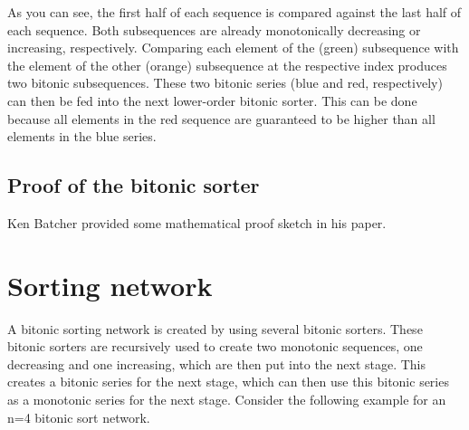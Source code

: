 \documentclass{article}
\newcommand{\compareBlock}[2][]{
    \pgfkeys{/compareBlock, default, #1}%
    \coordinate (\cbName_a) at ($(0, 1.33) + #2$);
    \coordinate (\cbName_b) at ($(0, 0.66) + #2$);
    \coordinate (\cbName_l) at ($(1.5, 0.66) + #2$);
    \coordinate (\cbName_h) at ($(1.5, 1.33) + #2$);

    \draw[color=\cbCA] (\cbName_a) -- ++(0.2, 0)node[anchor=west]{\cbA};
    \draw[color=\cbCB] (\cbName_b) -- ++(0.2, 0)node[anchor=west]{\cbB};
    \draw[color=\cbCL] (\cbName_l) -- ++(-0.2, 0)node[anchor=east]{\cbL};
    \draw[color=\cbCH] (\cbName_h) -- ++(-0.2, 0)node[anchor=east]{\cbH};
    \draw[draw=black] #2 rectangle ++(1.5,2);
}
\newcommand{\connectCB}[3]{
    \draw[color=#3] (#1) -- (#2);
}
\newcommand{\outputCB}[3]{
    \coordinate (#2) at ($(#1_h) + (0.25, 0)$);
    \coordinate (#3) at ($(#1_l) + (0.25, 0)$);
    \node at (#2) [anchor=west]{#2};
    \node at (#3) [anchor=west]{#3};
    \connectCB{#2}{#1_h}{black}
    \connectCB{#3}{#1_l}{black}
}
\begin{document}
As you can see, the first half of each sequence is compared against the last half of each sequence. 
Both subsequences are already monotonically decreasing or increasing, respectively.
Comparing each element of the (green) subsequence with the element of the other (orange) subsequence at the respective index produces two bitonic subsequences.
These two bitonic series (blue and red, respectively) can then be fed into the next lower-order bitonic sorter.
This can be done because all elements in the red sequence are guaranteed to be higher than all elements in the blue series.

\subsection{Proof of the bitonic sorter}

Ken Batcher provided some mathematical proof sketch in his paper.

\section{Sorting network}

A bitonic sorting network is created by using several bitonic sorters. 
These bitonic sorters are recursively used to create two monotonic sequences, one decreasing and one increasing, which are then put into the next stage.
This creates a bitonic series for the next stage, which can then use this bitonic series as a monotonic series for the next stage.
Consider the following example for an n=4 bitonic sort network.

\end{document}
